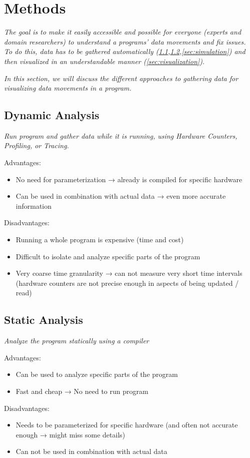 \section{Methods}\label{sec:methods}
\textit{The goal is to make it easily accessible and possible for everyone (experts and domain researchers) to understand a programs' data movements and fix issues. To do this, data has to be gathered automatically (\ref{sec:dynamic_analysis},\ref{sec:static_analysis},\ref{sec:simulation}) and then visualized in an understandable manner (\ref{sec:visualization}).}

\textit{In this section, we will discuss the different approaches to gathering data for visualizing data movements in a program.}

\subsection{Dynamic Analysis}\label{sec:dynamic_analysis}
\textit{Run program and gather data while it is running, using Hardware Counters, Profiling, or Tracing.}

Advantages:
\begin{itemize}
  \item No need for parameterization → already is compiled for specific hardware
  \item Can be used in combination with actual data → even more accurate information
\end{itemize}
Disadvantages:
\begin{itemize}
  \item Running a whole program is expensive (time and cost)
  \item Difficult to isolate and analyze specific parts of the program
  \item Very coarse time granularity → can not measure very short time intervals (hardware counters are not precise enough in aspects of being updated / read)
\end{itemize}

\subsection{Static Analysis}\label{sec:static_analysis}
\textit{Analyze the program statically using a compiler}

Advantages:
\begin{itemize}
  \item Can be used to analyze specific parts of the program
  \item Fast and cheap → No need to run program
\end{itemize}
Disadvantages:
\begin{itemize}
  \item Needs to be parameterized for specific hardware (and often not accurate enough → might miss some details)
  \item Can not be used in combination with actual data
\end{itemize}

